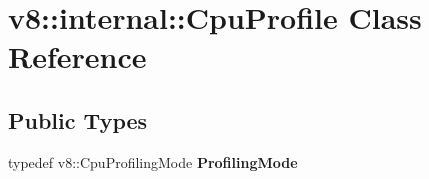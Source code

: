 \hypertarget{classv8_1_1internal_1_1CpuProfile}{}\section{v8\+:\+:internal\+:\+:Cpu\+Profile Class Reference}
\label{classv8_1_1internal_1_1CpuProfile}
\subsection*{Public Types}
\begin{DoxyCompactItemize}
\item 
\mbox{\label{classv8_1_1internal_1_1CpuProfile_ada46f242e5f8da78ea0b939325c0c04b}} 
typedef v8\+::\+Cpu\+Profiling\+Mode {\bfseries Profiling\+Mode}
\end{DoxyCompactItemize}
